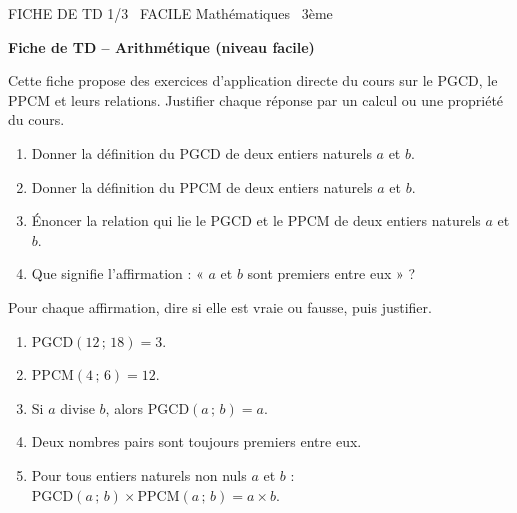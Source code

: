 \documentclass[11pt]{article}
\begin{document}
\begin{tcolorbox}[enhanced,colback=popink,colframe=popink,arc=10pt,boxrule=0pt,left=12pt,right=12pt,top=9pt,bottom=9pt]
{\color{white}\popxbold\small FICHE DE TD 1/3 \textbullet\ FACILE \hfill Mathématiques \textbullet\ 3ème\par}
\end{tcolorbox}
\vspace{4pt}
\textbf{Fiche de TD -- Arithmétique (niveau facile)}

Cette fiche propose des exercices d'application directe du cours sur le PGCD, le PPCM et leurs relations. Justifier chaque réponse par un calcul ou une propriété du cours.

\begin{exercice}
\begin{enumerate}
  \item Donner la définition du PGCD de deux entiers naturels $a$ et $b$.
  \item Donner la définition du PPCM de deux entiers naturels $a$ et $b$.
  \item Énoncer la relation qui lie le PGCD et le PPCM de deux entiers naturels $a$ et $b$.
  \item Que signifie l'affirmation : « $a$ et $b$ sont premiers entre eux » ?
\end{enumerate}
\end{exercice}

\begin{exercice}
Pour chaque affirmation, dire si elle est vraie ou fausse, puis justifier.
\begin{enumerate}
  \item $\mathrm{PGCD}(12\,;\,18) = 3$.
  \item $\mathrm{PPCM}(4\,;\,6) = 12$.
  \item Si $a$ divise $b$, alors $\mathrm{PGCD}(a\,;\,b) = a$.
  \item Deux nombres pairs sont toujours premiers entre eux.
  \item Pour tous entiers naturels non nuls $a$ et $b$ : $\mathrm{PGCD}(a\,;\,b) \times \mathrm{PPCM}(a\,;\,b) = a \times b$.
\end{enumerate}
\end{exercice}
\end{document}

